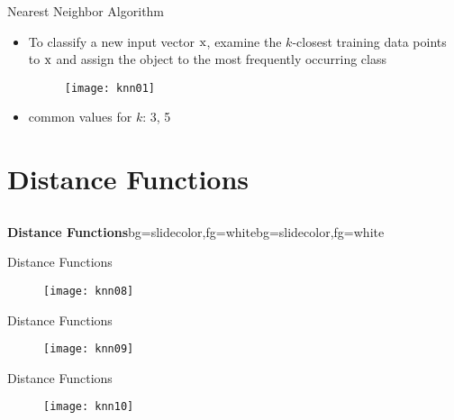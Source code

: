 \begin{frame}{Nearest Neighbor Algorithm}
\begin{itemize}
\item To classify a new input vector ${\rm x}$, examine the $k$-closest training data points to ${\rm x}$ and assign the object to the most frequently occurring class
\begin{figure}
\texttt{[image: knn01]}
\end{figure}
\item common values for $k$: 3, 5
\end{itemize}
\end{frame}


\section{Distance Functions}
\subsection{}

\begin{frame}{}
\begin{variableblock}{\centering \Large \textbf{\vspace{4pt}\newline Distance Functions\vspace{4pt}}}{bg=slidecolor,fg=white}{bg=slidecolor,fg=white}
\end{variableblock}
\end{frame}

\begin{frame}{Distance Functions}
\begin{figure}
\texttt{[image: knn08]}
\end{figure}
\end{frame}

\begin{frame}{Distance Functions}
\begin{figure}
\texttt{[image: knn09]}
\end{figure}
\end{frame}

\begin{frame}{Distance Functions}
\begin{figure}
\texttt{[image: knn10]}
\end{figure}
\end{frame}

